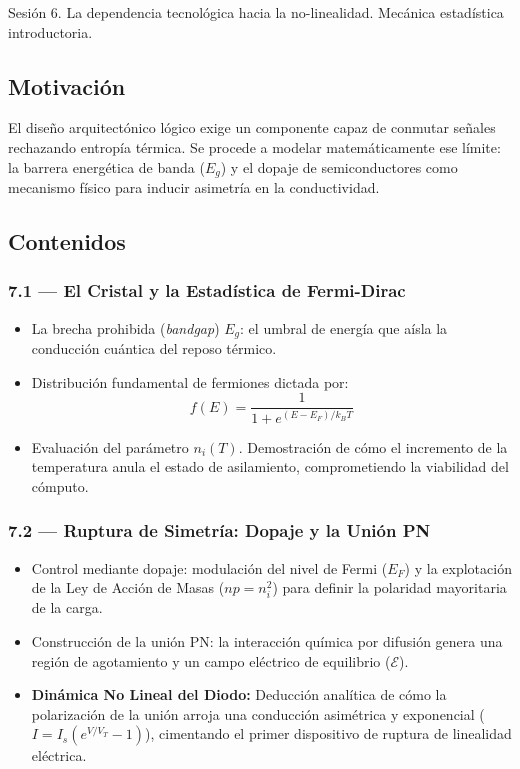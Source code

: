 \documentclass[11pt, letterpaper]{article}
\begin{document}
\begin{prereqs}
Sesi\'on 6. La dependencia tecnol\'ogica hacia la no-linealidad. Mec\'anica estad\'istica introductoria.
\end{prereqs}

\subsection*{Motivaci\'on}
El dise\~no arquitect\'onico l\'ogico exige un componente capaz de conmutar se\~nales rechazando entrop\'ia t\'ermica. Se procede a modelar matem\'aticamente ese l\'imite: la barrera energ\'etica de banda ($E_g$) y el dopaje de semiconductores como mecanismo f\'isico para inducir asimetr\'ia en la conductividad.

\subsection{Contenidos}

\subsubsection{7.1 --- El Cristal y la Estad\'istica de Fermi-Dirac}
\begin{itemize}
  \item La brecha prohibida (\emph{bandgap}) $E_g$: el umbral de energ\'ia que a\'isla la conducci\'on cu\'antica del reposo t\'ermico.
  \item Distribución fundamental de fermiones dictada por:
    \[f(E)=\frac{1}{1+e^{(E-E_F)/k_BT}}\]
  \item Evaluaci\'on del par\'ametro $n_i(T)$. Demostraci\'on de c\'omo el incremento de la temperatura anula el estado de asilamiento, comprometiendo la viabilidad del c\'omputo.
\end{itemize}

\subsubsection{7.2 --- Ruptura de Simetr\'ia: Dopaje y la Uni\'on PN}
\begin{itemize}
  \item Control mediante dopaje: modulaci\'on del nivel de Fermi ($E_F$) y la explotaci\'on de la Ley de Acci\'on de Masas ($np = n_i^2$) para definir la polaridad mayoritaria de la carga.
  \item Construcci\'on de la uni\'on PN: la interacci\'on qu\'imica por difusi\'on genera una regi\'on de agotamiento y un campo el\'ectrico de equilibrio ($\mathcal{E}$).
  \item \textbf{Din\'amica No Lineal del Diodo:} Deducci\'on anal\'itica de c\'omo la polarizaci\'on de la uni\'on arroja una conducci\'on asim\'etrica y exponencial ($I = I_s(e^{V/V_T} - 1)$), cimentando el primer dispositivo de ruptura de linealidad el\'ectrica.
\end{itemize}
\end{document}
